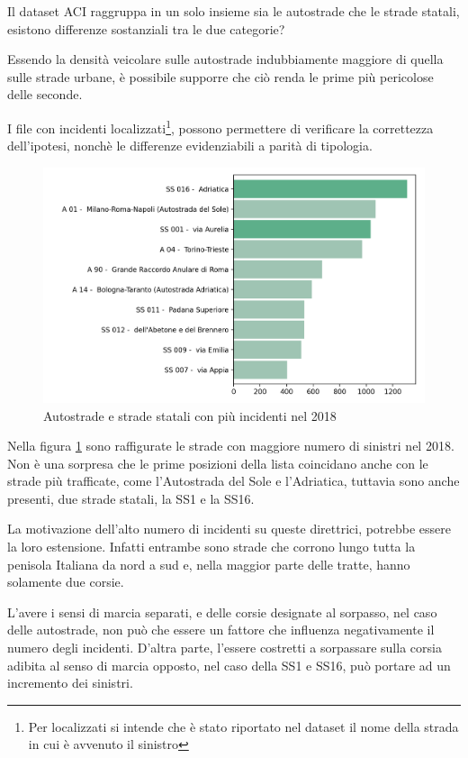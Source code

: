 \documentclass[a4paper,12pt]{report}
\begin{document}
Il dataset ACI raggruppa in un solo insieme sia le autostrade che le strade statali, 
esistono differenze sostanziali tra le due categorie? 

Essendo la densità veicolare sulle autostrade indubbiamente 
maggiore di quella sulle strade urbane, è possibile supporre che 
ciò renda le prime più pericolose delle seconde.

I file con incidenti 
localizzati\footnote{Per localizzati si intende che è stato riportato nel dataset 
il nome della strada in cui è avvenuto il sinistro}, 
possono permettere di verificare la correttezza dell'ipotesi, 
nonchè le differenze evidenziabili a parità di tipologia. 

\begin{figure}
    \includegraphics[width=\linewidth]{../src/incidenti/incidenti_aci/autostrade/autostrade.png}
    \caption{Autostrade e strade statali con più incidenti nel 2018}
    \label{fig:incidenti-autostrade}
\end{figure}

Nella figura \ref{fig:incidenti-autostrade} sono  raffigurate le strade con 
maggiore numero di sinistri nel 2018. 
Non è una sorpresa che le prime posizioni della lista coincidano 
anche con le strade più trafficate, come l'Autostrada del Sole e l'Adriatica, 
tuttavia sono anche presenti, due strade statali, la SS1 e la SS16. 

La motivazione dell'alto numero di incidenti su queste direttrici, potrebbe essere 
la loro estensione. Infatti entrambe sono strade che corrono lungo tutta la 
penisola Italiana da nord a sud e, nella maggior parte delle tratte, 
hanno solamente due corsie. 

L'avere i sensi di marcia separati, e delle corsie designate al sorpasso, nel caso 
delle autostrade, non può che essere un fattore che influenza negativamente 
il numero degli incidenti. 
D'altra parte, l'essere costretti a sorpassare sulla corsia adibita al senso di 
marcia opposto, nel caso della SS1 e SS16, può portare ad un incremento dei 
sinistri. 
\end{document}
